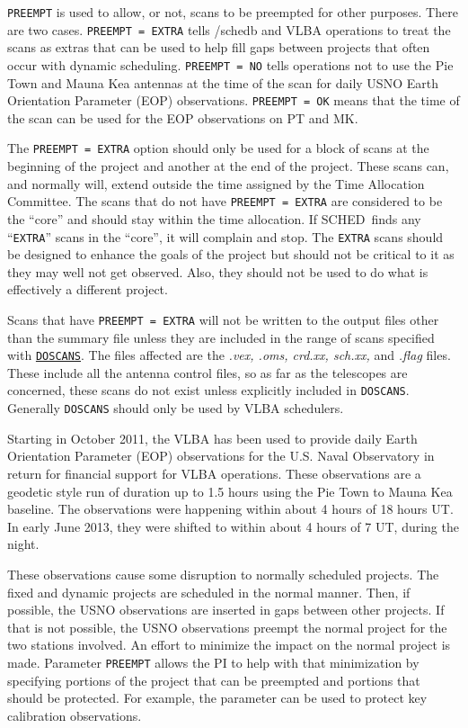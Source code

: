 \documentclass{report}
\newcommand{\schedb}{{\sc SCHED~}}
\begin{document}
{\tt PREEMPT} is used to allow, or not, scans to be preempted
for other purposes.  There are two cases.  {\tt PREEMPT = EXTRA}
tells /schedb and VLBA operations to treat the scans as extras
that can be used to help fill gaps between projects that often
occur with dynamic scheduling.  {\tt PREEMPT = NO} tells
operations not to use the Pie Town and Mauna Kea antennas at
the time of the scan for daily USNO Earth Orientation Parameter
(EOP) observations.  {\tt PREEMPT = OK} means that the time of
the scan can be used for the EOP observations on PT and MK.

The {\tt PREEMPT = EXTRA} option should only be used for a block of
scans at the beginning of the project and another at the end of the
project.  These scans can, and normally will, extend outside the time
assigned by the Time Allocation Committee.  The scans that do not have
{\tt PREEMPT = EXTRA} are considered to be the ``core'' and should
stay within the time allocation.  If \schedb finds any ``{\tt EXTRA}''
scans in the ``core'', it will complain and stop.  The {\tt EXTRA}
scans should be designed to enhance the goals of the project but
should not be critical to it as they may well not get observed.  Also,
they should not be used to do what is effectively a different project.

Scans that have {\tt PREEMPT = EXTRA} will not be written to the
output files other than the summary file unless they are included in
the range of scans specified with 
{\hyperref[MP:DOSCANS]{{\tt DOSCANS}}}.
The files affected are the {\sl .vex, .oms, crd.xx, sch.xx,} and {\sl
.flag} files.  These include all the antenna control files, so as far
as the telescopes are concerned, these scans do not exist unless
explicitly included in {\tt DOSCANS}.  Generally {\tt DOSCANS} should
only be used by VLBA schedulers.

Starting in October 2011, the VLBA has been used to provide daily
Earth Orientation Parameter (EOP) observations for the U.S. Naval
Observatory in return for financial support for VLBA operations.
These observations are a geodetic style run of duration up to 1.5
hours using the Pie Town to Mauna Kea baseline.  The observations were
happening within about 4 hours of 18 hours UT.  In early June 2013,
they were shifted to within about 4 hours of 7 UT, during the night.

These observations cause some disruption to normally scheduled
projects.  The fixed and dynamic projects are scheduled in the
normal manner.  Then, if possible, the USNO observations are
inserted in gaps between other projects.  If that is not possible,
the USNO observations preempt the normal project for the two
stations involved.  An effort to minimize the impact on the normal
project is made.  Parameter {\tt PREEMPT} allows the PI to
help with that minimization by specifying portions of the project
that can be preempted and portions that should be protected.  For
example, the parameter can be used to protect key calibration
observations.
\end{document}

